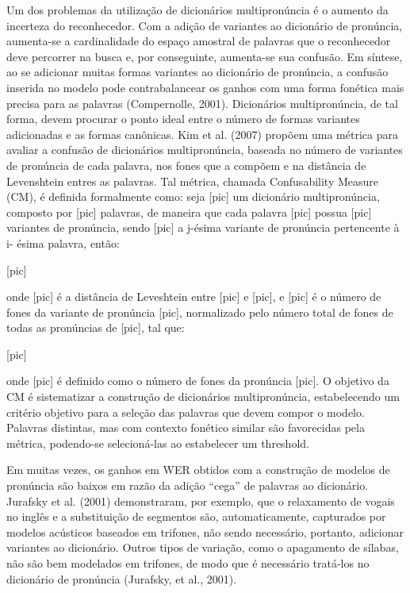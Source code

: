 Um dos problemas da utiliza\c{c}\~ao de dicion\'arios multipron\'uncia \'e o aumento
da incerteza do reconhecedor. Com a adi\c{c}\~ao de variantes ao dicion\'ario de
pron\'uncia, aumenta-se a cardinalidade do espa\c{c}o amostral de palavras que
o reconhecedor deve percorrer na busca e, por conseguinte, aumenta-se
sua confus\~ao. Em s\'intese, ao se adicionar muitas formas variantes ao
dicion\'ario de pron\'uncia, a confus\~ao inserida no modelo pode
contrabalancear os ganhos com uma forma fon\'etica mais precisa para as
palavras (Compernolle, 2001). Dicion\'arios multipron\'uncia, de tal forma,
devem procurar o ponto ideal entre o n\'umero de formas variantes
adicionadas e as formas can\^onicas. Kim et al. (2007) prop\~oem uma m\'etrica
para avaliar a confus\~ao de dicion\'arios multipron\'uncia, baseada no n\'umero
de variantes de pron\'uncia de cada palavra, nos fones que a comp\~oem e na
dist\^ancia de Levenshtein entres as palavras. Tal m\'etrica, chamada
Confusability Measure (CM), \'e definida formalmente como: seja {[}pic{]}
um dicion\'ario multipron\'uncia, composto por {[}pic{]} palavras, de
maneira que cada palavra {[}pic{]} possua {[}pic{]} variantes de
pron\'uncia, sendo {[}pic{]} a j-\'esima variante de pron\'uncia pertencente à
i- \'esima palavra, ent\~ao:

{[}pic{]}

onde {[}pic{]} \'e a dist\^ancia de Leveshtein entre {[}pic{]} e {[}pic{]},
e {[}pic{]} \'e o n\'umero de fones da variante de pron\'uncia {[}pic{]},
normalizado pelo n\'umero total de fones de todas as pron\'uncias de
{[}pic{]}, tal que:

                                [pic]

onde {[}pic{]} \'e definido como o n\'umero de fones da pron\'uncia {[}pic{]}.
O objetivo da CM \'e sistematizar a constru\c{c}\~ao de dicion\'arios
multipron\'uncia, estabelecendo um crit\'erio objetivo para a sele\c{c}\~ao das
palavras que devem compor o modelo. Palavras distintas, mas com contexto
fon\'etico similar s\~ao favorecidas pela m\'etrica, podendo-se selecion\'a-las
ao estabelecer um threshold.

Em muitas vezes, os ganhos em WER obtidos com a constru\c{c}\~ao de modelos de
pron\'uncia s\~ao baixos em raz\~ao da adi\c{c}\~ao ``cega'' de palavras ao
dicion\'ario. Jurafsky et al. (2001) demonstraram, por exemplo, que o
relaxamento de vogais no ingl\^es e a substitui\c{c}\~ao de segmentos s\~ao,
automaticamente, capturados por modelos ac\'usticos baseados em trifones,
n\~ao sendo necess\'ario, portanto, adicionar variantes ao dicion\'ario.
Outros tipos de varia\c{c}\~ao, como o apagamento de s\'ilabas, n\~ao s\~ao bem
modelados em trifones, de modo que \'e necess\'ario trat\'a-los no dicion\'ario
de pron\'uncia (Jurafsky, et al., 2001).

